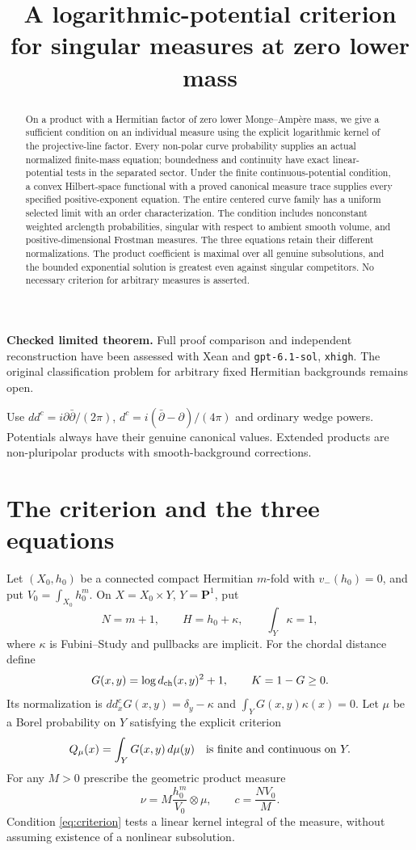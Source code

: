 \documentclass[11pt]{article}
\title{A logarithmic-potential criterion for singular measures at zero lower mass}
\author{}\date{}
\newcommand{\ddc}{dd^c}
\newcommand{\dc}{d^c}
\theoremstyle{remark}\newtheorem{remark}[theorem]{Remark}
\begin{document}
\maketitle
\noindent\textbf{Checked limited theorem.} Full proof comparison and
independent reconstruction have been assessed with Xean and
\texttt{gpt-6.1-sol}, \texttt{xhigh}. The original classification problem
for arbitrary fixed Hermitian backgrounds remains open.
\begin{abstract}
On a product with a Hermitian factor of zero lower Monge--Amp\`ere mass,
we give a sufficient condition on an individual measure using the
explicit logarithmic kernel of the projective-line factor. Every non-polar
curve probability supplies an actual normalized finite-mass equation;
boundedness and continuity have exact linear-potential tests in the
separated sector. Under the finite continuous-potential condition, a
convex Hilbert-space functional with a proved canonical measure trace
supplies every specified positive-exponent equation.
The entire centered curve family has a uniform selected limit with an
order characterization. The condition includes nonconstant weighted
arclength probabilities, singular with respect to ambient smooth volume,
and positive-dimensional Frostman measures. The three equations retain
their different normalizations. The product coefficient is maximal over all
genuine subsolutions, and the bounded exponential solution is greatest even
against singular competitors. No necessary criterion for arbitrary measures
is asserted.
\end{abstract}

Use $\ddc=i\partial\bar\partial/(2\pi)$,
$\dc=i(\bar\partial-\partial)/(4\pi)$ and ordinary wedge powers.
Potentials always have their genuine canonical values. Extended products
are non-pluripolar products with smooth-background corrections.

\section{The criterion and the three equations}
Let $(X_0,h_0)$ be a connected compact Hermitian $m$-fold with
$v_-(h_0)=0$, and put $V_0=\int_{X_0}h_0^m$.
On $X=X_0\times Y$, $Y=\mathbf P^1$, put
\[
 N=m+1,\qquad H=h_0+\kappa,\qquad \int_Y\kappa=1,
\]
where $\kappa$ is Fubini--Study and pullbacks are implicit.
For the chordal distance define
\[
 G(x,y)=\log d_{\rm ch}(x,y)^2+1,\qquad K=1-G\geq0.
\]
Its normalization is
$\ddc_xG(x,y)=\delta_y-\kappa$ and $\int_YG(x,y)\kappa(x)=0$.
Let $\mu$ be a Borel probability on $Y$ satisfying the explicit criterion
\begin{equation}\label{eq:criterion}
 Q_\mu(x)=\int_YG(x,y)\,d\mu(y)\quad\hbox{is finite and continuous on }Y.
\end{equation}
For any $M>0$ prescribe the geometric product measure
\[
 \nu=M\frac{h_0^m}{V_0}\otimes\mu,\qquad c=\frac{NV_0}{M}.
\]
Condition \eqref{eq:criterion} tests a linear kernel integral of the
measure, without assuming existence of a nonlinear subsolution.
\end{document}
